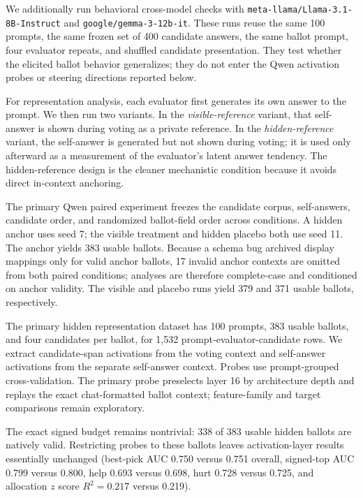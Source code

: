 \documentclass[11pt]{article}
\begin{document}
We additionally run behavioral cross-model checks with
\texttt{meta-llama/Llama-3.1-8B-Instruct} and
\texttt{google/gemma-3-12b-it}. These runs reuse the same 100 prompts, the
same frozen set of 400 candidate answers, the same ballot prompt, four evaluator
repeats, and shuffled candidate presentation. They test whether the elicited
ballot behavior generalizes; they do not enter the Qwen activation probes or
steering directions reported below.

For representation analysis, each evaluator first generates its own answer to
the prompt. We then run two variants. In the \emph{visible-reference} variant,
that self-answer is shown during voting as a private reference. In the
\emph{hidden-reference} variant, the self-answer is generated but not shown
during voting; it is used only afterward as a measurement of the evaluator's
latent answer tendency. The hidden-reference design is the cleaner
mechanistic condition because it avoids direct in-context anchoring.

The primary Qwen paired experiment freezes the candidate corpus, self-answers,
candidate order, and randomized ballot-field order across conditions. A hidden
anchor uses seed 7; the visible treatment and hidden placebo both use seed 11.
The anchor yields 383 usable ballots. Because a schema bug archived display
mappings only for valid anchor ballots, 17 invalid anchor contexts are omitted
from both paired conditions; analyses are therefore complete-case and
conditioned on anchor validity. The visible and placebo runs yield 379 and 371
usable ballots, respectively.

The primary hidden representation dataset has 100 prompts, 383 usable ballots,
and four candidates per ballot, for 1{,}532 prompt-evaluator-candidate rows. We extract
candidate-span activations from the voting context and self-answer activations
from the separate self-answer context. Probes use prompt-grouped
cross-validation. The primary probe preselects layer 16 by architecture depth
and replays the exact chat-formatted ballot context; feature-family and target
comparisons remain exploratory.

The exact signed budget remains nontrivial: 338 of 383 usable hidden ballots
are natively valid. Restricting probes to these ballots leaves activation-layer
results essentially unchanged (best-pick AUC 0.750 versus 0.751 overall,
signed-top AUC 0.799 versus 0.800, help 0.693 versus 0.698, hurt 0.728 versus
0.725, and allocation $z$ score $R^2=0.217$ versus 0.219).
\end{document}

